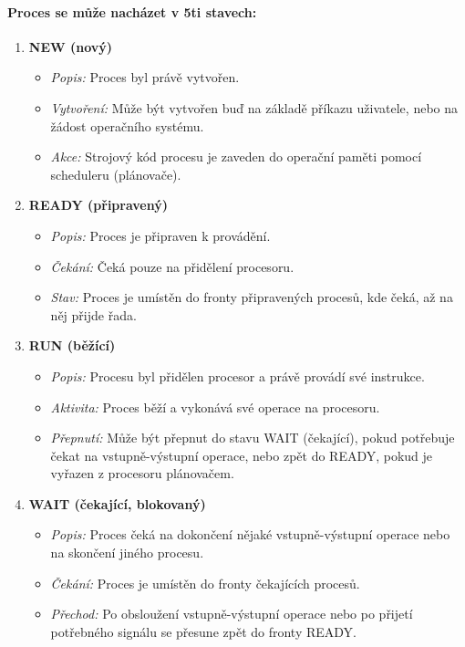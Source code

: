 \paragraph{Proces se může nacházet v 5ti stavech:}
\begin{enumerate}
    \item \textbf{NEW (nový)}
    \begin{itemize}
        \item \textit{Popis:} Proces byl právě vytvořen.
        \item \textit{Vytvoření:} Může být vytvořen buď na základě příkazu uživatele, nebo na žádost operačního systému.
        \item \textit{Akce:} Strojový kód procesu je zaveden do operační paměti pomocí scheduleru (plánovače).
    \end{itemize}
    
    \item \textbf{READY (připravený)}
    \begin{itemize}
        \item \textit{Popis:} Proces je připraven k provádění.
        \item \textit{Čekání:} Čeká pouze na přidělení procesoru.
        \item \textit{Stav:} Proces je umístěn do fronty připravených procesů, kde čeká, až na něj přijde řada.
    \end{itemize}
    
    \item \textbf{RUN (běžící)}
    \begin{itemize}
        \item \textit{Popis:} Procesu byl přidělen procesor a právě provádí své instrukce.
        \item \textit{Aktivita:} Proces běží a vykonává své operace na procesoru.
        \item \textit{Přepnutí:} Může být přepnut do stavu WAIT (čekající), pokud potřebuje čekat na vstupně-výstupní operace, nebo zpět do READY, pokud je vyřazen z procesoru plánovačem.
    \end{itemize}
    
    \item \textbf{WAIT (čekající, blokovaný)}
    \begin{itemize}
        \item \textit{Popis:} Proces čeká na dokončení nějaké vstupně-výstupní operace nebo na skončení jiného procesu.
        \item \textit{Čekání:} Proces je umístěn do fronty čekajících procesů.
        \item \textit{Přechod:} Po obsloužení vstupně-výstupní operace nebo po přijetí potřebného signálu se přesune zpět do fronty READY.
    \end{itemize}
    

\end{enumerate}
